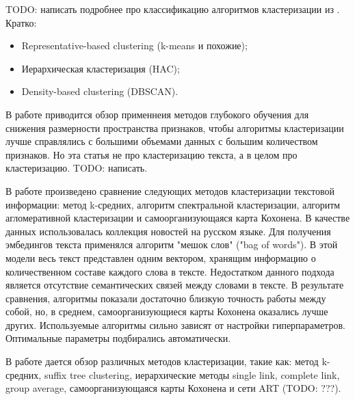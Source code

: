 TODO: написать подробнее про классификацию алгоритмов кластеризации из \cite{no-patterns}.
Кратко:
\begin{itemize}
    \item Representative-based clustering (k-means и похожие);
    \item Иерархическая кластеризация (HAC);
    \item Density-based clustering (DBSCAN).
\end{itemize}

В работе \cite{deep-clustering-survey} приводится обзор применнеия методов глубокого обучения для снижения размерности пространства признаков, чтобы алгоритмы кластеризации лучше справлялись с большими объемами данных с большим количеством признаков. Но эта статья не про кластеризацию текста, а в целом про кластеризацию. TODO: написать.

В работе \cite{compare-text-clustering-sokolov} произведено сравнение следующих методов кластеризации текстовой информации: метод k-средних, алгоритм спектральной кластеризации, алгоритм агломеративной кластеризации и самоорганизующаяся карта Кохонена. В качестве данных использовалась коллекция новостей на русском языке. Для получения эмбедингов текста применялся алгоритм "мешок слов" ("bag of words"). В этой модели весь текст представлен одним вектором, хранящим информацию о количественном составе каждого слова в тексте. Недостатком данного подхода является отсутствие семантических связей между словами в тексте. В результате сравнения, алгоритмы показали достаточно близкую точность работы между собой, но, в среднем, самоорганизующиеся карты Кохонена оказались лучше других. Используемые алгоритмы сильно зависят от настройки гиперпараметров. Оптимальные параметры подбирались автоматически.

В работе \cite{method-text-clustering-andreev} дается обзор различных методов кластеризации, такие как: метод k-средних, suffix tree clustering, иерархические методы single link, complete link, group average, самоорганизующаяся карты Кохонена и сети ART (TODO: ???).
